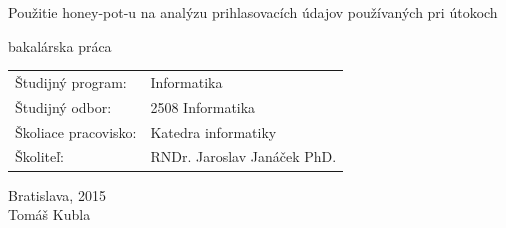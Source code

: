 \documentclass[12pt, oneside]{book}
\def\mfyear{2015}
\def\mftitle{Použitie honey-pot-u na analýzu prihlasovacích údajov používaných pri útokoch}
\def\mfthesistype{bakalárska práca}
\def\mfauthor{Tomáš Kubla}
\def\mfadvisor{RNDr. Jaroslav Janáček PhD.}
\def\mfplacedate{Bratislava, \mfyear}
\def\odbor{2508 Informatika} %
\def\program{ Informatika }
\def\stredisko{ Katedra informatiky }
\begin{document}
\begin{minipage}{1.1\textwidth}
\begin{flushright}
\bigskip\bigskip
\begin{center}
\sc\LARGE\mftitle
\end{center}
\bigskip
\centerline{\sc\mfthesistype}
\end{flushright}

\bigskip
\vspace{3cm}
\bigskip
\begin{tabular}{ll}
Študijný program: & \program \\
Študijný odbor: & \odbor \\
Školiace pracovisko: & \stredisko \\
Školiteľ: & \mfadvisor \\
\end{tabular}

\end{minipage}
\vfill

\noindent \mfplacedate\\
\indent\mfauthor

\eject %




\end{document}
